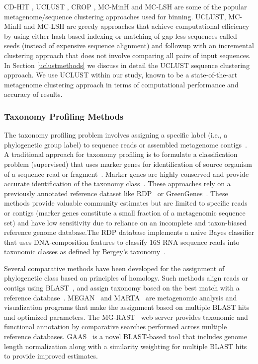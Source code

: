 CD-HIT \cite{Li01072006}, UCLUST \cite{Edgar10}, CROP \cite{Hao01032011}, MC-MinH \cite{sdm2013a} and 
MC-LSH \cite{bibm2012}
are some of the popular 
metagenome/sequence clustering approaches used for binning. 
%
UCLUST, MC-MinH and MC-LSH  are
greedy approaches that achieve computational efficiency 
by using either hash-based indexing or matching of gap-less sequences called seeds (instead 
of expensive sequence alignment) and followup with an incremental clustering approach 
that does not involve comparing all pairs of input sequences. In Section \ref{uclustmethods} we discuss 
in detail the UCLUST \cite{Edgar10}  sequence clustering approach. We use UCLUST within 
our study, known to be a state-of-the-art metagenome clustering approach in terms of 
computational performance and accuracy of results. 


\subsubsection{Taxonomy Profiling Methods}
\label{sec:tax}


The taxonomy profiling problem involves 
assigning a specific label (i.e., a phylogenetic group label) to sequence 
reads or assembled metagenome contigs~\cite{phymm}. A traditional 
approach for taxonomy profiling is to formulate  a 
classification problem (supervised) that uses marker genes for
  identification of source organism of a sequence read or fragment~\cite{Woese97}. Marker
  genes are highly conserved and provide accurate identification
  of the taxonomy class~\cite{ZongzhiLiu10012008}. These approaches 
  rely on a previously annotated 
  reference dataset like RDP~\cite{Cole2005,Cole2007,Cole2008} or GreenGenes~\cite{greengenes}. These methods
  provide
  valuable community estimates but are limited to specific 
  reads or contigs (marker genes constitute a small fraction of a metagenomic
  sequence set) and have low sensitivity due to reliance
  on an incomplete and taxon-biased reference genome database.The RDP database
  implements a naive Bayes classifier 
  that uses DNA-composition features to classify 16S RNA sequence reads into taxonomic classes as defined
  by Bergey's taxonomy~\cite{ZongzhiLiu10012008}.

  Several comparative methods have been developed for the assignment of phylogenetic class based on principles of homology. Such methods  align
  reads or contigs using BLAST~\cite{altschul90a}, and assign taxonomy based on the best match with a reference database~\cite{Tringe04222005}. MEGAN~\cite{megan} and MARTA~\cite{marta} are
  metagenomic analysis and visualization programs that  make the assignment based on multiple BLAST hits and optimized parameters.  The MG-RAST~\cite{mgrast}  web server
  provides taxonomic and functional annotation by comparative searches performed across multiple reference databases. GAAS~\cite{gaas} is a novel BLAST-based tool
  that includes genome length normalization along with a similarity weighting for multiple BLAST hits to provide improved estimates.

